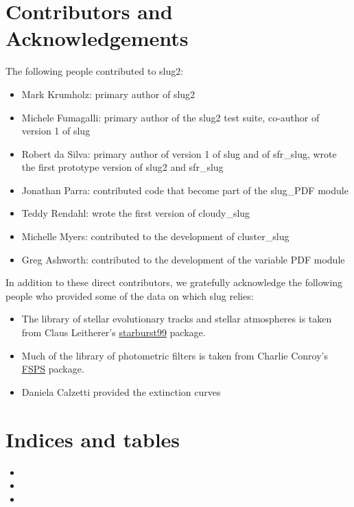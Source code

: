 \documentclass[letterpaper,10pt,english]{sphinxmanual}
\begin{document}
\chapter{Contributors and Acknowledgements}
\label{acknowledgements::doc}\label{acknowledgements:contributors-and-acknowledgements}
The following people contributed to slug2:
\begin{itemize}
\item {} 
Mark Krumholz: primary author of slug2

\item {} 
Michele Fumagalli: primary author of the slug2 test suite, co-author of version 1 of slug

\item {} 
Robert da Silva: primary author of version 1 of slug and of sfr\_slug, wrote the first prototype version of slug2 and sfr\_slug

\item {} 
Jonathan Parra: contributed code that become part of the slug\_PDF module

\item {} 
Teddy Rendahl: wrote the first version of cloudy\_slug

\item {} 
Michelle Myers: contributed to the development of cluster\_slug

\item {} 
Greg Ashworth: contributed to the development of the variable PDF module

\end{itemize}

In addition to these direct contributors, we gratefully acknowledge the following people who provided some of the data on which slug relies:
\begin{itemize}
\item {} 
The library of stellar evolutionary tracks and stellar atmospheres is taken from Claus Leitherer's \href{http://www.stsci.edu/science/starburst99/docs/default.htm}{starburst99} package.

\item {} 
Much of the library of photometric filters is taken from Charlie Conroy's \href{https://code.google.com/p/fsps/}{FSPS} package.

\item {} 
Daniela Calzetti provided the extinction curves

\end{itemize}


\chapter{Indices and tables}
\label{index:indices-and-tables}\begin{itemize}
\item {} 

\item {} 

\item {} 

\end{itemize}
\end{document}
